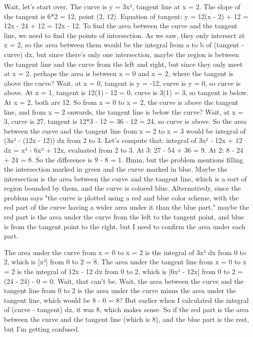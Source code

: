 Wait, let's start over. The curve is y = 3x², tangent line at x = 2. The slope of the tangent is 6*2 = 12, point (2, 12). Equation of tangent: y = 12(x - 2) + 12 = 12x - 24 + 12 = 12x - 12. To find the area between the curve and the tangent line, we need to find the points of intersection. As we saw, they only intersect at x = 2, so the area between them would be the integral from a to b of (tangent - curve) dx, but since there's only one intersection, maybe the region is between the tangent line and the curve from the left and right, but since they only meet at x = 2, perhaps the area is between x = 0 and x = 2, where the tangent is above the curve? Wait, at x = 0, tangent is y = -12, curve is y = 0, so curve is above. At x = 1, tangent is 12(1) - 12 = 0, curve is 3(1) = 3, so tangent is below. At x = 2, both are 12. So from x = 0 to x = 2, the curve is above the tangent line, and from x = 2 onwards, the tangent line is below the curve? Wait, at x = 3, curve is 27, tangent is 12*3 - 12 = 36 - 12 = 24, so curve is above. So the area between the curve and the tangent line from x = 2 to x = 3 would be integral of (3x² - (12x - 12)) dx from 2 to 3. Let's compute that: integral of 3x² - 12x + 12 dx = x³ - 6x² + 12x, evaluated from 2 to 3. At 3: 27 - 54 + 36 = 9. At 2: 8 - 24 + 24 = 8. So the difference is 9 - 8 = 1. Hmm, but the problem mentions filling the intersection marked in green and the curve marked in blue. Maybe the intersection is the area between the curve and the tangent line, which is a sort of region bounded by them, and the curve is colored blue. Alternatively, since the problem says "the curve is plotted using a red and blue color scheme, with the red part of the curve having a wider area under it than the blue part," maybe the red part is the area under the curve from the left to the tangent point, and blue is from the tangent point to the right, but I need to confirm the area under each part.

The area under the curve from x = 0 to x = 2 is the integral of 3x² dx from 0 to 2, which is [x³] from 0 to 2 = 8. The area under the tangent line from x = 0 to x = 2 is the integral of 12x - 12 dx from 0 to 2, which is [6x² - 12x] from 0 to 2 = (24 - 24) - 0 = 0. Wait, that can't be. Wait, the area between the curve and the tangent line from 0 to 2 is the area under the curve minus the area under the tangent line, which would be 8 - 0 = 8? But earlier when I calculated the integral of (curve - tangent) dx, it was 8, which makes sense. So if the red part is the area between the curve and the tangent line (which is 8), and the blue part is the rest, but I'm getting confused.

